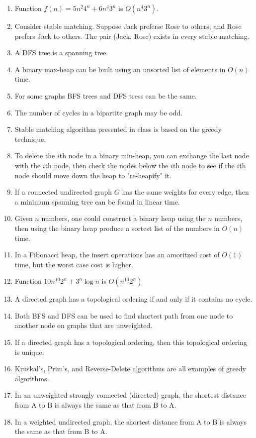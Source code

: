 \documentclass[12pt]{article}
\begin{document}
\begin{enumerate}
    \item Function $f(n)=5n^2 4^n + 6n^4 3^n$ is $O(n^4 3^n)$.
    \item Consider stable matching. Suppose Jack preferse Rose to others, and Rose prefers Jack to others. The pair (Jack, Rose) exists in every stable matching.
    \item A DFS tree is a spanning tree.
    \item A binary max-heap can be built using an unsorted list of elements in $O(n)$ time.
    \item For some graphs BFS trees and DFS tress can be the same.
    \item The number of cycles in a bipartite graph may be odd.
    \item Stable matching algorithm presented in class is based on the greedy technique.
    \item To delete the $i$th node in a binary min-heap, you can exchange the last node with the $i$th node, then check the nodes below the $i$th node to see if the $i$th node should move down the heap to "re-heapify" it.
    \item If a connected undirected graph $G$ has the same weights for every edge, then a minimum spanning tree can be found in linear time.
    \item Given $n$ numbers, one could construct a binary heap using the $n$ numbers, then using the binary heap produce a sortest list of the numbers in $O(n)$ time.
    \item In a Fibonacci heap, the insert operations has an amoritzed cost of $O(1)$ time, but the worst case cost is higher.
    \item Function $10n^{10} 2^n + 3^n\log n$ is $O(n^{10} 2^n)$
    \item A directed graph has a topological ordering if and only if it contains no cycle.
    \item Both BFS and DFS can be used to find shortest path from one node to another node on graphs that are unweighted.
    \item If a directed graph has a topological ordering, then this topological ordering is unique.
    \item Kruskal's, Prim's, and Reverse-Delete algorithms are all examples of greedy algorithms.
    \item In an unweighted strongly connected (directed) graph, the shortest distance from A to B is always the same as that from B to A.
    \item In a weighted undirected graph, the shortest distance from A to B is always the same as that from B to A.

\end{enumerate}
\end{document}

